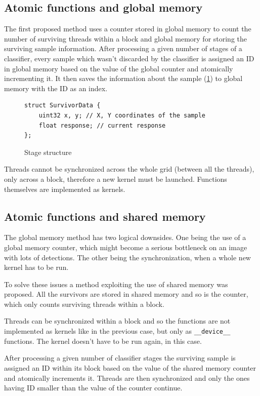 \subsection{Atomic functions and global memory} \label{subsec:afgm}

The first proposed method uses a counter stored in global memory to count the number of surviving threads within a block and global memory for storing the surviving sample information. After processing a given number of stages of a classifier, every sample which wasn't discarded by the classifier is assigned an ID in global memory based on the value of the global counter and atomically incrementing it. It then saves the information about the sample (\ref{fig:survivordata}) to global memory with the ID as an index.

\begin{figure}[h!] \label{fig:survivordata}
\begin{verbatim}
struct SurvivorData {
    uint32 x, y; // X, Y coordinates of the sample
    float response; // current response
};
\end{verbatim}
\caption{Stage structure}
\end{figure}

Threads cannot be synchronized across the whole grid (between all the threads), only across a block, therefore a new kernel must be launched. Functions themselves are implemented as kernels.

\subsection{Atomic functions and shared memory}

The global memory method has two logical downsides. One being the use of a global memory counter, which might become a serious bottleneck on an image with lots of detections. The other being the synchronization, when a whole new kernel has to be run.

To solve these issues a method exploiting the use of shared memory was proposed. All the survivors are stored in shared memory and so is the counter, which only counts surviving threads within a block.

Threads can be synchronized within a block and so the functions are not implemented as kernels like in the previous case, but only as \verb|__device__| functions. The kernel doesn't have to be run again,  in this case.

After processing a given number of classifier stages the surviving sample is assigned an ID within its block based on the value of the shared memory counter and atomically increments it. Threads are then synchronized and only the ones having ID smaller than the value of the counter continue.

